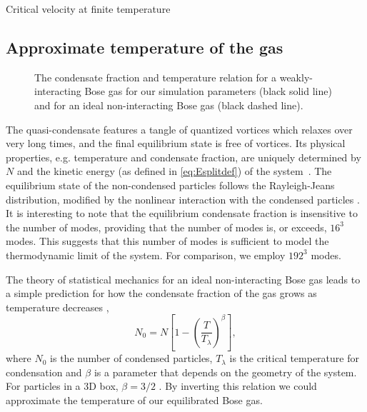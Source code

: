 \begin{chapter}{\label{cha:nonequib}Critical velocity at finite temperature}
\subsection{Approximate temperature of the gas}
\begin{figure}
\begin{center}
%
\end{center}
\caption{\label{fig:cfvst}The condensate fraction and temperature relation for a weakly-interacting Bose gas for our simulation parameters (black solid line) and for an ideal non-interacting Bose gas (black dashed line).}
\end{figure} 

The quasi-condensate features a tangle of quantized vortices which relaxes over very long times, and the final equilibrium state is free of vortices.  Its physical properties, e.g. temperature and condensate fraction, are uniquely determined by $N$ and the kinetic energy (as defined in \ref{eq:Esplitdef}) of the system~\cite{PhysRevLett.95.263901}.  The equilibrium state of the non-condensed particles follows the Rayleigh-Jeans distribution, modified by the nonlinear interaction with the condensed particles \cite{PhysRevLett.95.263901}.  It is interesting to note that the equilibrium condensate fraction is insensitive to the number of modes, providing that the number of modes is, or exceeds, $16^3$ modes.  This suggests that this number of modes is sufficient to model the thermodynamic limit of the system. For comparison, we employ $192^3$ modes.

The theory of statistical mechanics for an ideal non-interacting Bose gas leads to a simple prediction for how the condensate fraction of the gas grows as temperature decreases \cite{Pethick},
\begin{equation}
N_0 = N \left [ 1-\left ( \frac{T}{T_\lambda} \right )^\beta \right ],
\end{equation}
where $N_0$ is the number of condensed particles, $T_{\lambda}$ is the critical temperature for condensation and $\beta$ is a parameter that depends on the geometry of the system. For particles in a 3D box, $\beta=3/2$ \cite{Pethick}. By inverting this relation we could approximate the temperature of our equilibrated Bose gas.


\end{chapter}
